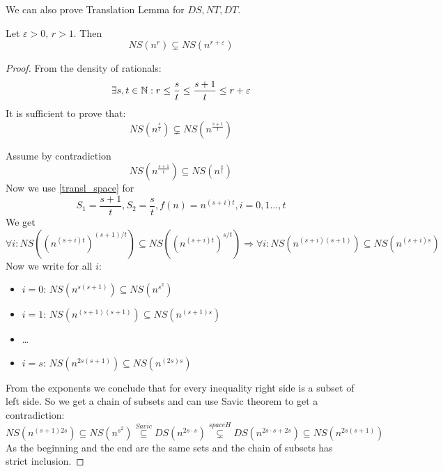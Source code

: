 \begin{note}
	We can also prove Translation Lemma for $DS, NT, DT$.
\end{note}

\begin{theorem}
	Let $\varepsilon > 0,\, r > 1$. Then
	\[ NS(n^r) \subsetneq NS(n^{r + \varepsilon}) \]
\end{theorem}
\begin{proof}
	From the density of rationals:
	\[ \exists s,t \in \operatorname{\mathbb{N}}: r \leq \frac{s}{t} \leq \frac{s + 1}{t} \leq r + \varepsilon \]
	It is sufficient to prove that:
	\[ NS(n^{\frac{s}{t}}) \subsetneq NS(n^{\frac{s + 1}{t}}) \]

	Assume by contradiction
	\[ NS(n^{\frac{s+1}{t}}) \subseteq NS(n^{\frac{s}{t}}) \]
	Now we use \cref{transl_space} for
	\[ S_1 = \frac{s+1}{t}, S_2 = \frac{s}{t}, f(n) = n^{(s + i)t}, i = 0, 1 \ldots, t \]
	We get
	\[ \forall i: NS((n^{(s + i)t})^{(s + 1)/t}) \subseteq NS((n^{(s + i)t})^{s/t}) \Rightarrow \forall i: NS(n^{(s + i)(s + 1)}) \subseteq NS(n^{(s + i)s}) \]
	Now we write for all $i$:
	\begin{itemize}
		\item $i = 0:\, NS(n^{s(s + 1)}) \subseteq NS(n^{s^2}) $
		\item $i = 1:\, NS(n^{(s + 1)(s + 1)}) \subseteq NS(n^{(s + 1)s}) $
		\item \ldots
		\item $i = s:\, NS(n^{2s(s + 1)}) \subseteq NS(n^{(2s)s}) $
	\end{itemize}
	From the exponents we conclude that for every inequality right side is a subset of left side.
	So we get a chain of subsets and can use Savic theorem to get a contradiction:
	\[ NS(n^{(s + 1)2s}) \subseteq NS(n^{s^2}) \stackrel{Savic}{\subseteq} DS(n^{2s \cdot s}) \stackrel{space H}{\subsetneq} DS(n^{2s \cdot s + 2s}) \subseteq NS(n^{2s(s + 1)}) \]
	As the beginning and the end are the same sets and the chain of subsets has strict inclusion.

\end{proof}

